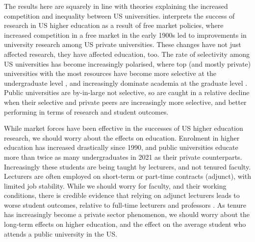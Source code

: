 The results here are squarely in line with theories explaining the increased competition and inequality between US universities.
\cite{urquiola2020markets} interprets the success of research in US higher education as a result of free market policies, where increased competition in a free market in the early 1900s led to improvements in university research among US private universities.
These changes have not just affected research, they have affected education, too.
The rate of selectivity among US universities has become increasingly polarised, where top (and mostly private) universities with the most resources have become more selective at the undergraduate level \citep{hoxby2009changing}, and increasingly dominate academia at the graduate level \citep{wapman2022quantifying}.
Public universities are by-in-large not selective, so are caught in a relative decline when their selective and private peers are increasingly more selective, and better performing in terms of research and student outcomes.

While market forces have been effective in the successes of US higher education research, we should worry about the effects on education.
Enrolment in higher education has increased drastically since 1990, and public universities educate more than twice as many undergraduates in 2021 as their private counterparts.
Increasingly these students are being taught by lecturers, and not tenured faculty.
Lecturers are often employed on short-term or part-time contracts (adjunct), with limited job stability.
While we should worry for faculty, and their working conditions, there is credible evidence that relying on adjunct lecturers leads to worse student outcomes, relative to full-time lecturers and professors \citep{zhu2021limited}.
As tenure has increasingly become a private sector phenomenon, we should worry about the long-term effects on higher education, and the effect on the average student who attends a public university in the US.

